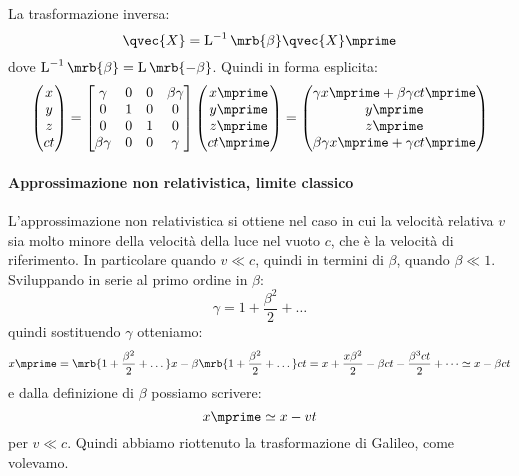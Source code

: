 La trasformazione inversa:
\begin{equation}
	\qvec{X} = \operatorname{L}^{-1}\mrb{\beta} \qvec{X}\mprime
\end{equation}
dove $\operatorname{L}^{-1}\mrb{\beta} = \operatorname{L}\mrb{-\beta}$.
Quindi in forma esplicita:
\begin{equation}
	\begin{pmatrix}
		x
		\\
		y
		\\
		z
		\\
		ct
	\end{pmatrix} =
	\begin{bmatrix}
		\gamma       & 0 & 0 & \beta \gamma
		\\
		0            & 1 & 0 & 0
		\\
		0            & 0 & 1 & 0
		\\
		\beta \gamma & 0 & 0 & \gamma
	\end{bmatrix}
	\begin{pmatrix}
		x \mprime
		\\
		y \mprime
		\\
		z \mprime
		\\
		ct \mprime
	\end{pmatrix} =
	\begin{pmatrix}
		\gamma x \mprime + \beta \gamma c t \mprime
		\\
		y \mprime
		\\
		z \mprime
		\\
		\beta \gamma x \mprime + \gamma ct \mprime
	\end{pmatrix}
\end{equation}

\paragraph{Approssimazione non relativistica, limite classico}
L'approssimazione non relativistica si ottiene nel caso in cui la velocità
relativa $v$ sia molto minore della velocità della luce nel vuoto $c$, che è la
velocità di riferimento. In particolare quando $v \ll c$, quindi in termini di
$\beta$, quando $\beta \ll 1$. Sviluppando in serie al primo ordine in $\beta$:
\begin{equation}
	\gamma = 1 + \frac{\beta^2}{2} + \dots
\end{equation}
quindi sostituendo $\gamma$ otteniamo:
\begin{equation}
	x \mprime = \mrb{1 + \frac{\beta^2}{2} + \dots} x - \beta \mrb{1 +
		\frac{\beta^2}{2} + \dots} ct
	= x + \frac{x \beta^2}{2} - \beta ct - \frac{\beta^3 ct}{2} + \dots
	\simeq x - \beta ct
\end{equation}
e dalla definizione di $\beta$ possiamo scrivere:
\begin{equation}
	x \mprime \simeq x - vt
\end{equation}
per $v \ll c$. Quindi abbiamo riottenuto la trasformazione di Galileo, come
volevamo.

